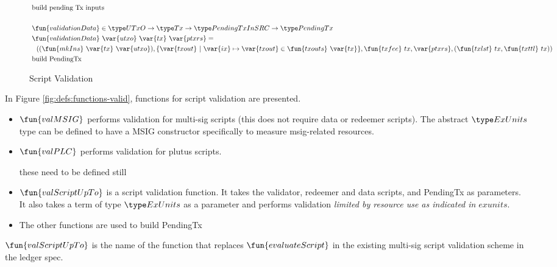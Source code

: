 \begin{figure*}[htb]
\begin{align*}
    & \text{build pending Tx inputs} \\~\\
    & \fun{validationData} \in \UTxO \to \Tx \to \PendingTxInSRC \to \PendingTx \\
    & \fun{validationData}~\var{utxo}~\var{tx}~\var{ptxrs} = \\ &
    ~~ ((\fun{mkIns}~\var{tx}~\var{utxo}),\{ \var{txout}~\vert~ \var{ix} \mapsto \var{txout} \in \fun{txouts}~\var{tx}\},
    \fun{txfee}~{tx},\var{ptxrs},(\fun{txlst}~{tx},\fun{txttl}~{tx})) \\
    & \text{build PendingTx} \\
  \end{align*}
  \caption{Script Validation}
  \label{fig:defs:functions-helper}
\end{figure*}


In Figure \ref{fig:defs:functions-valid}, functions for script validation
are presented.

\begin{itemize}
  \item $\fun{valMSIG}$ performs validation for multi-sig scripts
  (this does not require data or redeemer scripts). The abstract $\ExUnits$
  type can be defined to have a MSIG constructor specifically to
  measure msig-related resources.
  \item $\fun{valPLC}$ performs validation for plutus scripts.
  \begin{note}
    these need to be defined still
  \end{note}
\item $\fun{valScriptUpTo}$ is a script validation function. It takes the
validator, redeemer and data scripts, and PendingTx as parameters. It also
takes a term of type $\ExUnits$ as a parameter and performs validation
\textit{limited by resource use as indicated in} $exunits$.
\item The other functions are used to build PendingTx
\end{itemize}

\begin{note}
  $\fun{valScriptUpTo}$  is the name of the function that replaces
  $\fun{evaluateScript}$ in the existing multi-sig script validation
  scheme in the ledger spec.
\end{note}

